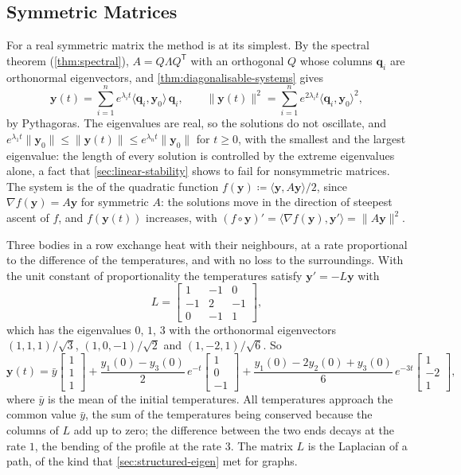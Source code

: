 \subsection{Symmetric Matrices}

For a real symmetric matrix the method is at its simplest. By the spectral theorem (\cref{thm:spectral}), $A=Q\Lambda Q^{\mathsf T}$ with an orthogonal $Q$ whose columns $\mathbf q_i$ are orthonormal eigenvectors, and \cref{thm:diagonalisable-systems} gives
\[
\mathbf y(t)=\sum_{i=1}^ne^{\lambda_it}\langle\mathbf q_i,\mathbf y_0\rangle\,\mathbf q_i,\qquad\|\mathbf y(t)\|^2=\sum_{i=1}^ne^{2\lambda_it}\langle\mathbf q_i,\mathbf y_0\rangle^2,
\]
by Pythagoras. The eigenvalues are real, so the solutions do not oscillate, and $e^{\lambda_1t}\|\mathbf y_0\|\le\|\mathbf y(t)\|\le e^{\lambda_nt}\|\mathbf y_0\|$ for $t\ge0$, with the smallest and the largest eigenvalue: the length of every solution is controlled by the extreme eigenvalues alone, a fact that \cref{sec:linear-stability} shows to fail for nonsymmetric matrices. The system is the  of the quadratic function $f(\mathbf y)\coloneqq\langle\mathbf y,A\mathbf y\rangle/2$, since $\nabla f(\mathbf y)=A\mathbf y$ for symmetric $A$: the solutions move in the direction of steepest ascent of $f$, and $f(\mathbf y(t))$ increases, with $(f\circ\mathbf y)'=\langle\nabla f(\mathbf y),\mathbf y'\rangle=\|A\mathbf y\|^2$.

Three bodies in a row exchange heat with their neighbours, at a rate proportional to the difference of the temperatures, and with no loss to the surroundings. With the unit constant of proportionality the temperatures satisfy $\mathbf y'=-L\mathbf y$ with
\[
L=\begin{bmatrix}1&-1&0\\-1&2&-1\\0&-1&1\end{bmatrix},
\]
which has the eigenvalues $0$, $1$, $3$ with the orthonormal eigenvectors $(1,1,1)/\sqrt3$, $(1,0,-1)/\sqrt2$ and $(1,-2,1)/\sqrt6$. So
\[
\mathbf y(t)=\bar y\begin{bmatrix}1\\1\\1\end{bmatrix}+\frac{y_1(0)-y_3(0)}2\,e^{-t}\begin{bmatrix}1\\0\\-1\end{bmatrix}+\frac{y_1(0)-2y_2(0)+y_3(0)}6\,e^{-3t}\begin{bmatrix}1\\-2\\1\end{bmatrix},
\]
where $\bar y$ is the mean of the initial temperatures. All temperatures approach the common value $\bar y$, the sum of the temperatures being conserved because the columns of $L$ add up to zero; the difference between the two ends decays at the rate $1$, the bending of the profile at the rate $3$. The matrix $L$ is the Laplacian of a path, of the kind that \cref{sec:structured-eigen} met for graphs.

